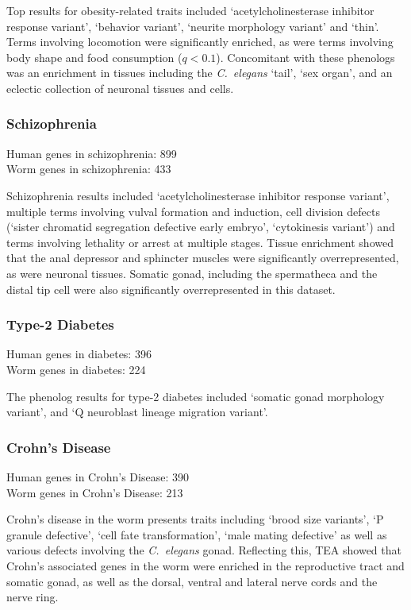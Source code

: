 \documentclass[10pt,letterpaper,twocolumn]{article}
\newcommand{\cel}{\emph{C.~elegans}}
\begin{document}
Top results for obesity-related traits included `acetylcholinesterase inhibitor
response variant', `behavior variant', `neurite morphology variant' and `thin'.
Terms involving locomotion were significantly enriched, as were terms involving
body shape and food consumption ($q<0.1$). Concomitant with these phenologs was
an enrichment in tissues including the \cel{} `tail', `sex organ', and an
eclectic collection of neuronal tissues and cells.

\subsubsection*{Schizophrenia}
Human genes in schizophrenia: 899\\
Worm genes in schizophrenia: 433

Schizophrenia results included `acetylcholinesterase inhibitor response variant',
multiple terms involving vulval formation and induction, cell division defects
(`sister chromatid segregation defective early embryo', `cytokinesis variant')
and terms involving lethality or arrest at multiple stages. Tissue enrichment
showed that the anal depressor and sphincter muscles were significantly
overrepresented, as were neuronal tissues. Somatic gonad, including the
spermatheca and the distal tip cell were also significantly overrepresented in
this dataset.

\subsubsection*{Type-2 Diabetes}
Human genes in diabetes: 396\\
Worm genes in diabetes: 224

The phenolog results for type-2 diabetes included `somatic gonad morphology
variant', and `Q neuroblast lineage migration variant'.

\subsubsection*{Crohn's Disease}
Human genes in Crohn's Disease: 390\\
Worm genes in Crohn's Disease: 213

Crohn's disease in the worm presents traits including `brood size variants',
`P granule defective', `cell fate transformation', `male mating defective' as
well as various defects involving the \cel{} gonad. Reflecting this, TEA showed
that Crohn's associated genes in the worm were enriched in the reproductive
tract and somatic gonad, as well as the dorsal, ventral and lateral nerve cords
and the nerve ring.
\end{document}
